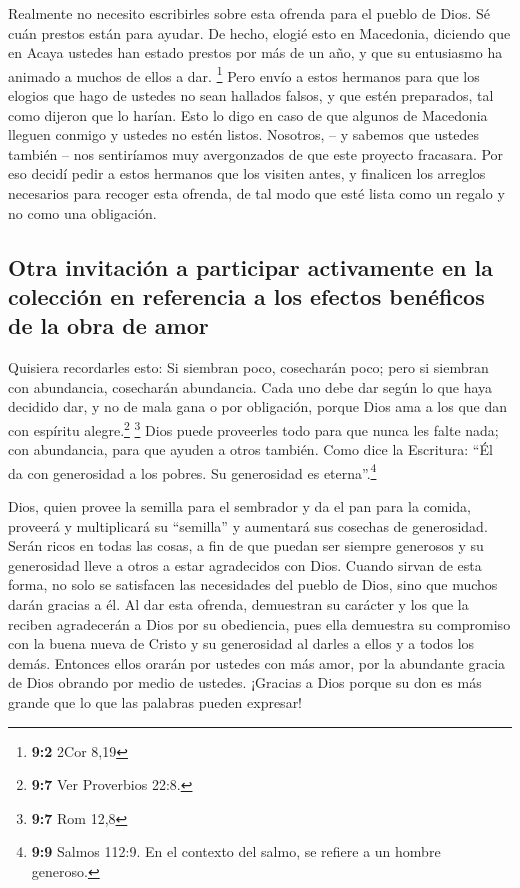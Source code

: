  Realmente no necesito escribirles sobre esta ofrenda para
el pueblo de Dios.  Sé cuán prestos están para ayudar. De
hecho, elogié esto en Macedonia, diciendo que en Acaya ustedes han
estado prestos por más de un año, y que su entusiasmo ha animado a
muchos de ellos a dar. \footnote{\textbf{9:2} 2Cor 8,19} 
Pero envío a estos hermanos para que los elogios que hago de ustedes no
sean hallados falsos, y que estén preparados, tal como dijeron que lo
harían.  Esto lo digo en caso de que algunos de Macedonia
lleguen conmigo y ustedes no estén listos. Nosotros, -- y sabemos que
ustedes también -- nos sentiríamos muy avergonzados de que este proyecto
fracasara.  Por eso decidí pedir a estos hermanos que los
visiten antes, y finalicen los arreglos necesarios para recoger esta
ofrenda, de tal modo que esté lista como un regalo y no como una
obligación.

\hypertarget{otra-invitaciuxf3n-a-participar-activamente-en-la-colecciuxf3n-en-referencia-a-los-efectos-benuxe9ficos-de-la-obra-de-amor}{%
\subsection{Otra invitación a participar activamente en la colección en
referencia a los efectos benéficos de la obra de
amor}\label{otra-invitaciuxf3n-a-participar-activamente-en-la-colecciuxf3n-en-referencia-a-los-efectos-benuxe9ficos-de-la-obra-de-amor}}

 Quisiera recordarles esto: Si siembran poco, cosecharán
poco; pero si siembran con abundancia, cosecharán abundancia.
 Cada uno debe dar según lo que haya decidido dar, y no de
mala gana o por obligación, porque Dios ama a los que dan con espíritu
alegre.\footnote{\textbf{9:7} Ver Proverbios 22:8.} \footnote{\textbf{9:7}
  Rom 12,8}  Dios puede proveerles todo para que nunca les
falte nada; con abundancia, para que ayuden a otros también.
 Como dice la Escritura: ``Él da con generosidad a los
pobres. Su generosidad es eterna''.\footnote{\textbf{9:9} Salmos 112:9.
  En el contexto del salmo, se refiere a un hombre generoso.}

 Dios, quien provee la semilla para el sembrador y da el
pan para la comida, proveerá y multiplicará su ``semilla'' y aumentará
sus cosechas de generosidad.  Serán ricos en todas las
cosas, a fin de que puedan ser siempre generosos y su generosidad lleve
a otros a estar agradecidos con Dios.  Cuando sirvan de
esta forma, no solo se satisfacen las necesidades del pueblo de Dios,
sino que muchos darán gracias a él.  Al dar esta ofrenda,
demuestran su carácter y los que la reciben agradecerán a Dios por su
obediencia, pues ella demuestra su compromiso con la buena nueva de
Cristo y su generosidad al darles a ellos y a todos los demás.
 Entonces ellos orarán por ustedes con más amor, por la
abundante gracia de Dios obrando por medio de ustedes. 
¡Gracias a Dios porque su don es más grande que lo que las palabras
pueden expresar!

